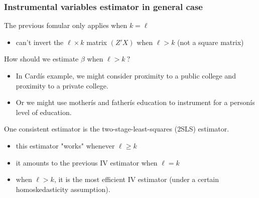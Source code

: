 \documentclass[a4paper,twoside,11pt]{article}
\begin{document}
\subsubsection{Instrumental variables estimator in general case}
The \textcolor{NavyBlue}{previous fomular} only applies when $k = \ell$ 
\begin{itemize}
    \item can't invert the $\ell \times k$ matrix $(Z'X)$ when $\ell > k$ (not a square matrix)
\end{itemize}
How should we estimate $\beta$ when $\ell > k \ ?$ 
\begin{itemize}
    \item In Cardís example, we might consider proximity to a public college and proximity to a private college.
    \item Or we might use motherís and fatherís education to instrument for a personís level of education.
\end{itemize}
One consistent estimator is the two-stage-least-squares (2SLS) estimator.
\begin{itemize}
    \item this estimator "works" whenever $\ell \ge k$ 
    \item it amounts to the previous IV estimator when $\ell =k$ 
    \item when $\ell > k$, it is the most efficient IV estimator (under a certain
    homoskedasticity assumption).
\end{itemize}
\end{document}

